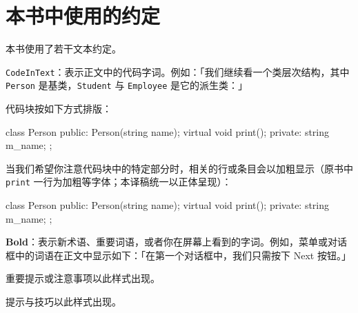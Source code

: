 \section*{本书中使用的约定}

本书使用了若干文本约定。

\texttt{CodeInText}：表示正文中的代码字词。例如：「我们继续看一个类层次结构，其中 \texttt{Person} 是基类，\texttt{Student} 与 \texttt{Employee} 是它的派生类：」

代码块按如下方式排版：

\begin{codebox}
class Person {
   public:
     Person(string name);
     virtual void print();
   private:
     string m_name;
};
\end{codebox}

当我们希望你注意代码块中的特定部分时，相关的行或条目会以加粗显示（原书中 \texttt{print} 一行为加粗等字体；本译稿统一以正体呈现）：

\begin{codebox}
class Person {
   public:
     Person(string name);
     virtual void print();
   private:
     string m_name;
};
\end{codebox}

\textbf{Bold}：表示新术语、重要词语，或者你在屏幕上看到的字词。例如，菜单或对话框中的词语在正文中显示如下：「在第一个对话框中，我们只需按下 Next 按钮。」

重要提示或注意事项以此样式出现。

提示与技巧以此样式出现。
